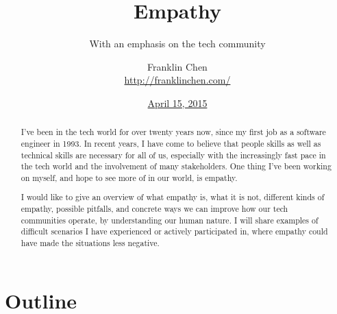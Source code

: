{
}

\usepackage[utf8]{inputenc}
\usepackage{booktabs}

\usepackage{minted}

\title{Empathy}
\subtitle{With an emphasis on the tech community}
\author{Franklin Chen \\ \url{http://franklinchen.com/}}
\date[April 15, 2015]{\href{http://www.meetup.com/Pittsburgh-Code-Supply/events/221553015/}{April 15, 2015}}

\subject{Talks}




\maketitle

\begin{abstract}
I've been in the tech world for over twenty years now, since my first job as a software engineer in 1993. In recent years, I have come to believe that people skills as well as technical skills are necessary for all of us, especially with the increasingly fast pace in the tech world and the involvement of many stakeholders. One thing I've been working on myself, and hope to see more of in our world, is empathy.

I would like to give an overview of what empathy is, what it is not, different kinds of empathy, possible pitfalls, and concrete ways we can improve how our tech communities operate, by understanding our human nature. I will share examples of difficult scenarios I have experienced or actively participated in, where empathy could have made the situations less negative.
\end{abstract}

\begin{frame}
  \titlepage{}
\end{frame}

\section*{Outline}

